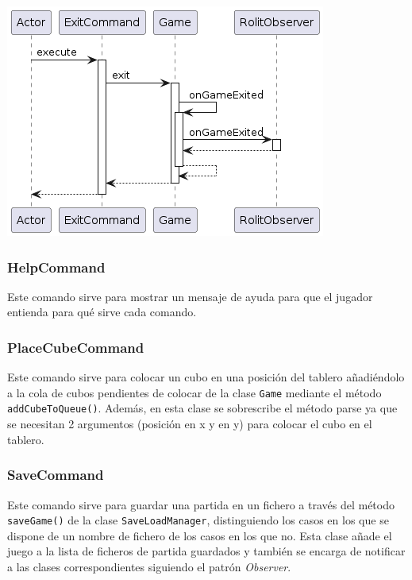 \documentclass[../DocumentoOficial.tex]{subfiles}
\begin{document}
\begin{center}
\includegraphics[scale=0.55]{ExitCommand_execute_final.png}
\end{center}

\subsubsection{HelpCommand}

Este comando sirve para mostrar un mensaje de ayuda para que el jugador entienda para qué sirve cada comando.

\subsubsection{PlaceCubeCommand}

Este comando sirve para colocar un cubo en una posición del tablero añadiéndolo a la cola de cubos pendientes de colocar de la clase \texttt{Game} mediante el método \texttt{addCubeToQueue()}. Además, en esta clase se sobrescribe el método parse ya que se necesitan 2 argumentos (posición en x y en y) para colocar el cubo en el tablero.

\subsubsection{SaveCommand}

Este comando sirve para guardar una partida en un fichero a través del método \texttt{saveGame()} de la clase \texttt{SaveLoadManager}, distinguiendo los casos en los que se dispone de un nombre de fichero de los casos en los que no. Esta clase añade el juego a la lista de ficheros de partida guardados y también se encarga de notificar a las clases correspondientes siguiendo el patrón \textit{Observer}.
\end{document}
